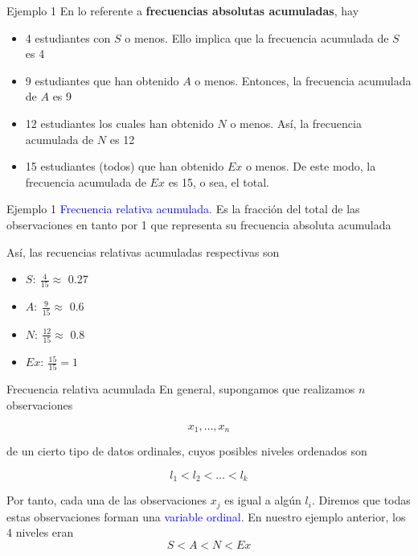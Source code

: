 \documentclass[
  ignorenonframetext,
]{beamer}
\providecommand{\tightlist}{%
  \setlength{\itemsep}{0pt}\setlength{\parskip}{0pt}}
\newcommand\blue[1]{\textcolor{blue}{#1}}
\begin{document}
\begin{frame}{Ejemplo 1}
\label{ejemplo-1-2}
En lo referente a \textbf{frecuencias absolutas acumuladas}, hay

\begin{itemize}
\tightlist
\item
  4 estudiantes con \(S\) o menos. Ello implica que la frecuencia
  acumulada de \(S\) es 4
\item
  9 estudiantes que han obtenido \(A\) o menos. Entonces, la frecuencia
  acumulada de \(A\) es 9
\item
  12 estudiantes los cuales han obtenido \(N\) o menos. Así, la
  frecuencia acumulada de \(N\) es 12
\item
  15 estudiantes (todos) que han obtenido \(Ex\) o menos. De este modo,
  la frecuencia acumulada de \(Ex\) es 15, o sea, el total.
\end{itemize}
\end{frame}

\begin{frame}{Ejemplo 1}
\label{ejemplo-1-3}
\blue{
Frecuencia relativa acumulada.
} Es la fracción del total de las observaciones en tanto por 1 que
representa su frecuencia absoluta acumulada

Así, las recuencias relativas acumuladas respectivas son

\begin{itemize}
\tightlist
\item
  \(S:\ \frac{4}{15} \approx\) 0.27
\item
  \(A:\ \frac{9}{15}\approx\) 0.6
\item
  \(N:\ \frac{12}{15}\approx\) 0.8
\item
  \(Ex:\ \frac{15}{15}=1\)
\end{itemize}
\end{frame}

\begin{frame}{Frecuencia relativa acumulada}
\label{frecuencia-relativa-acumulada}
En general, supongamos que realizamos \(n\) observaciones

\[x_1,\dots,x_n\]

de un cierto tipo de datos ordinales, cuyos posibles niveles ordenados
son

\[l_1<l_2<\dots<l_k\]

Por tanto, cada una de las observaciones \(x_j\) es igual a algún
\(l_i\). Diremos que todas estas observaciones forman una
\blue{variable ordinal}. En nuestro ejemplo anterior, los 4 niveles eran
\[S<A<N<Ex\]
\end{frame}
\end{document}
